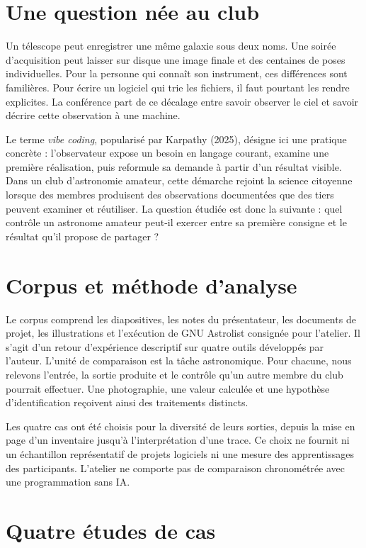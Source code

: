 \documentclass[11pt,letterpaper]{article}
\begin{document}
\section{Une question née au club}
Un télescope peut enregistrer une même galaxie sous deux noms. Une soirée d'acquisition peut laisser sur disque une image finale et des centaines de poses individuelles. Pour la personne qui connaît son instrument, ces différences sont familières. Pour écrire un logiciel qui trie les fichiers, il faut pourtant les rendre explicites. La conférence part de ce décalage entre savoir observer le ciel et savoir décrire cette observation à une machine.

Le terme \emph{vibe coding}, popularisé par Karpathy (2025), désigne ici une pratique concrète : l'observateur expose un besoin en langage courant, examine une première réalisation, puis reformule sa demande à partir d'un résultat visible. Dans un club d'astronomie amateur, cette démarche rejoint la science citoyenne lorsque des membres produisent des observations documentées que des tiers peuvent examiner et réutiliser. La question étudiée est donc la suivante : quel contrôle un astronome amateur peut-il exercer entre sa première consigne et le résultat qu'il propose de partager ?

\section{Corpus et méthode d'analyse}
Le corpus comprend les diapositives, les notes du présentateur, les documents de projet, les illustrations et l'exécution de GNU Astrolist consignée pour l'atelier. Il s'agit d'un retour d'expérience descriptif sur quatre outils développés par l'auteur. L'unité de comparaison est la tâche astronomique. Pour chacune, nous relevons l'entrée, la sortie produite et le contrôle qu'un autre membre du club pourrait effectuer. Une photographie, une valeur calculée et une hypothèse d'identification reçoivent ainsi des traitements distincts.

Les quatre cas ont été choisis pour la diversité de leurs sorties, depuis la mise en page d'un inventaire jusqu'à l'interprétation d'une trace. Ce choix ne fournit ni un échantillon représentatif de projets logiciels ni une mesure des apprentissages des participants. L'atelier ne comporte pas de comparaison chronométrée avec une programmation sans IA.



\section{Quatre études de cas}
\end{document}
